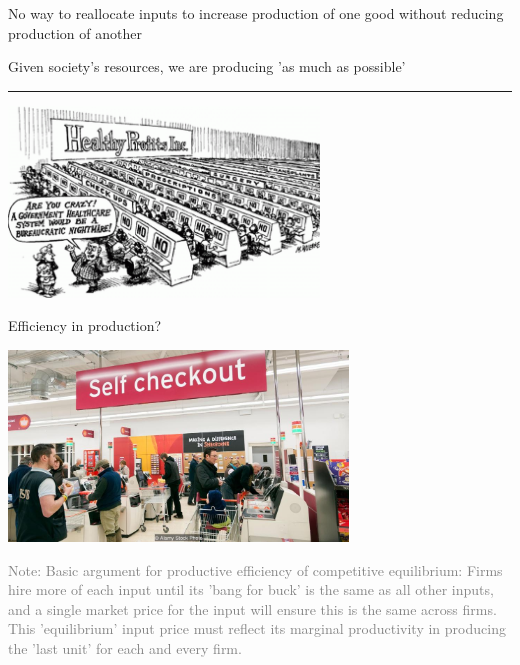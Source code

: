 \documentclass[]{article}
\providecommand{\tightlist}{%
  \setlength{\itemsep}{0pt}\setlength{\parskip}{0pt}}
\begin{document}
\begin{description}
\tightlist
\item[Efficiency in production (being on the PPF)]
No way to reallocate inputs to increase production of one good without reducing production of another
\end{description}

\bigskip

\begin{centering}

Given society's resources, we are producing 'as much as possible'

\end{centering}

\begin{center}\rule{0.5\linewidth}{\linethickness}\end{center}

\includegraphics[height=2in]{picsfigs/hightower_cartoon1.png}

Efficiency in production?

\includegraphics[height=2in]{picsfigs/self-checkout.jpg}

\textcolor{gray}{Note: Basic argument for productive efficiency of competitive equilibrium:
Firms hire more of each input until its 'bang for buck' is the same as all other inputs,
and a single market price for the input will ensure this is the same across firms.
This 'equilibrium' input price must reflect its marginal productivity
in producing the 'last unit' for each and every firm.}
\end{document}
